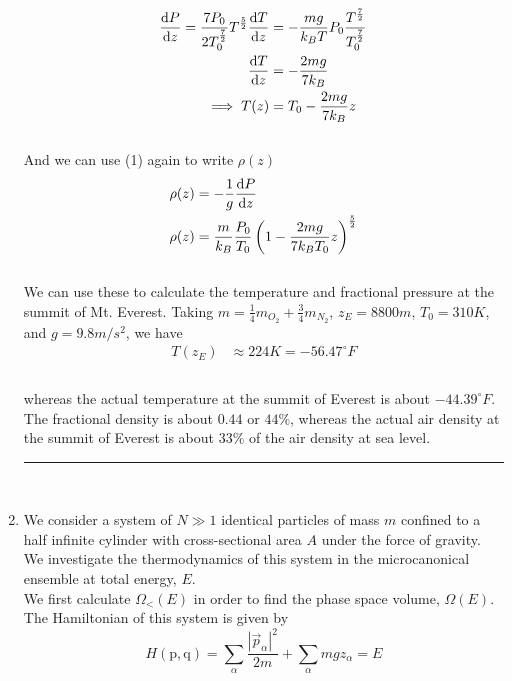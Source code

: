 \documentclass[]{book}
\begin{document}
\begin{enumerate}[1)]
\begin{equation}
\begin{split}
\dv{P}{z} = \frac{7P_0}{2T_0^\frac{7}{2}} T^\frac{5}{2}\dv{T}{z} &  = -\frac{mg}{k_BT} P_0 \frac{T^\frac{7}{2}}{T_0^\frac{7}{2}} \\ 
\dv{T}{z} & = -\frac{2mg}{7k_B} \\
\implies T(z) & = T_0 -\frac{2mg}{7k_B}z \\
\end{split}
\end{equation} \\
And we can use (1) again to write $\rho(z)$
\begin{equation}
\begin{split}
\rho(z) & = - \frac{1}{g} \dv{P}{z} \\
\rho(z) & = \frac{m}{k_B} \frac{P_0}{T_0}  \left( 1 - \frac{2mg}{7k_BT_0}z\right)^\frac{5}{2}
 \end{split}
\end{equation} \\
We can use these to calculate the temperature and fractional pressure at the summit of Mt. Everest. Taking $m = \frac{1}{4} m_{O_2} + \frac{3}{4} m_{N_2 }$, $z_E = 8800 m$, $T_0 = 310 K$, and $g = 9.8 m/s^2$, we have
\begin{equation}
\begin{split}
T(z_E) & \approx  224 K = -56.47 ^{\circ} F\\
 \end{split}
\end{equation} \\
whereas the actual temperature at the summit of Everest is about $-44.39^{\circ}F$. The fractional density is about $0.44$ or $44\%$, whereas the actual air density at the summit of Everest is about $33\%$ of the air density at sea level. \\
\noindent\rule{15cm}{0.4pt} \\
\item
We consider a system of $N \gg1$ identical particles of mass $m$ confined to a half infinite cylinder with cross-sectional area $A$ under the force of gravity. We investigate the thermodynamics of this system in the microcanonical ensemble at total energy, $E$. \\
We first calculate $\Omega_<(E)$ in order to find the phase space volume, $\Omega(E)$. The Hamiltonian of this system is given by
\begin{equation}
H(\text{p},\text{q}) = \sum_\alpha \frac{|\vec{p}_\alpha|^2}{2m} + \sum_\alpha mgz_\alpha = E

\end{equation}
\end{enumerate}
\end{document}
